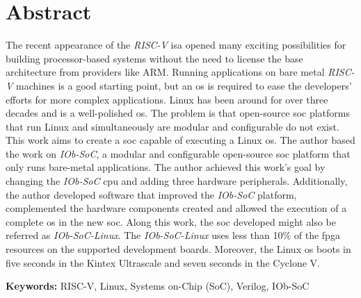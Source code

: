 \cleardoubleoddpage

\chapter*{Abstract}
\thispagestyle{empty} %
The recent appearance of the \textit{RISC-V} \acrshort{isa} opened many exciting possibilities for building processor-based systems without the need to license the base architecture from providers like ARM. Running applications on bare metal \textit{RISC-V} machines is a good starting point, but an \acrshort{os} is required to ease the developers' efforts for more complex applications. Linux has been around for over three decades and is a well-polished \acrshort{os}. The problem is that open-source \acrshort{soc} platforms that run Linux and simultaneously are modular and configurable do not exist.
This work aims to create a \acrshort{soc} capable of executing a Linux \acrshort{os}. The author based the work on \textit{IOb-SoC}, a modular and configurable open-source \acrshort{soc} platform that only runs bare-metal applications. The author achieved this work's goal by changing the \textit{IOb-SoC} \acrshort{cpu} and adding three hardware peripherals. Additionally, the author developed software that improved the \textit{IOb-SoC} platform, complemented the hardware components created and allowed the execution of a complete \acrshort{os} in the new \acrshort{soc}. Along this work, the \acrshort{soc} developed might also be referred as \textit{IOb-SoC-Linux}.
The \textit{IOb-SoC-Linux} uses less than 10\% of the \acrshort{fpga} resources on the supported development boards. Moreover, the Linux \acrshort{os} boots in five seconds in the Kintex Ultrascale and seven seconds in the Cyclone V.


\vfill

\textbf{\Large Keywords:} RISC-V, Linux, Systems on-Chip (SoC), Verilog, IOb-SoC